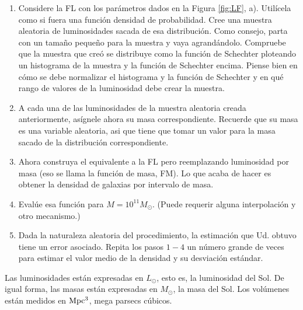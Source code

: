 \documentclass[letter, 11pt]{article}
\begin{document}
\begin{enumerate}

\item Considere la FL con los parámetros dados en la Figura \ref{fig:LF}, a).
  Utilícela como si fuera una función densidad de probabilidad. Cree una
  muestra aleatoria de luminosidades sacada de esa distribución. Como consejo,
  parta con un tamaño pequeño para la muestra y vaya agrandándolo. Compruebe
  que la muestra que creó se distribuye como la función de Schechter ploteando
  un histograma de la muestra y la función de Schechter encima. Piense bien en
  cómo se debe normalizar el histograma y la función de Schechter y en qué
  rango de valores de la luminosidad debe crear la muestra.

\item A cada una de las luminosidades de la muestra aleatoria creada
  anteriormente, asígnele ahora su masa correspondiente. Recuerde que su masa
  es una variable aleatoria, asi que tiene que tomar un valor para la masa
  sacado de la distribución correspondiente.

\item Ahora construya el equivalente a la FL pero reemplazando luminosidad por
  masa (eso se llama la función de masa, FM). Lo que acaba de hacer es obtener
  la densidad de galaxias por intervalo de masa.

\item Evalúe esa función para $M=10^{11} M_\odot$. (Puede requerir alguna
  interpolación y otro mecanismo.)

\item Dada la naturaleza aleatoria del procedimiento, la estimación que Ud.
  obtuvo tiene un error asociado. Repita los pasos $1-4$ un número grande de
  veces para estimar el valor medio de la densidad y su desviación estándar.

\end{enumerate}

\begin{ayuda}
  \small

  Las luminosidades están expresadas en $L_\odot$, esto es, la luminosidad del
  Sol. De igual forma, las masas están expresadas en $M_\odot$, la masa del
  Sol. Los volúmenes están medidos en ${\rm Mpc^3}$, mega parsecs cúbicos.
\end{ayuda}

\end{document}
